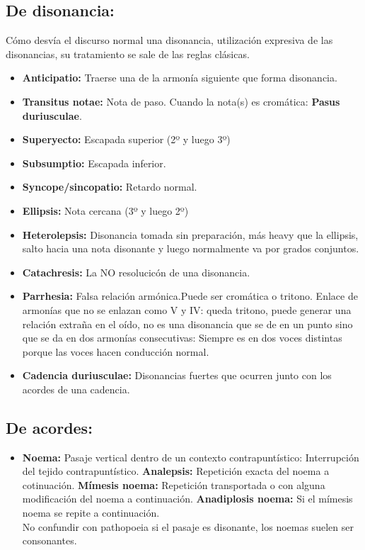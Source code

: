 \documentclass[11pt,a4paper]{article}
\begin{document}
		\subsection{De disonancia:}
			Cómo desvía el discurso normal una disonancia, utilización expresiva de las disonancias, su tratamiento se sale de las reglas clásicas.
			\begin{itemize}
				\item \textbf{Anticipatio:} Traerse una de la armonía siguiente que forma disonancia.
				\item \textbf{Transitus notae:} Nota de paso. Cuando la nota(s) es cromática: \textbf{Pasus duriusculae}.
				\item \textbf{Superyecto:} Escapada superior (2º y luego 3º)
				\item \textbf{Subsumptio:} Escapada inferior.
				\item \textbf{Syncope/sincopatio:} Retardo normal.
				\item \textbf{Ellipsis:} Nota cercana (3º y luego 2º)
				\item \textbf{Heterolepsis:} Disonancia tomada sin preparación, más heavy que la ellipsis, salto hacia una nota disonante y luego normalmente va por grados conjuntos.
				\item \textbf{Catachresis:} La NO resolucicón de una disonancia.
				\item \textbf{Parrhesia:} Falsa relación armónica.Puede ser cromática o tritono. Enlace de armonías que no se enlazan como V y IV: queda tritono, puede generar una relación extraña en el oído, no es una disonancia que se de en un punto sino que se da en dos armonías consecutivas: Siempre es en dos voces distintas porque las voces hacen conducción normal.
				\item \textbf{Cadencia duriusculae:} Disonancias fuertes que ocurren junto con los acordes de una cadencia.
			\end{itemize}
		\subsection{De acordes:}
			\begin{itemize}
				\item \textbf{Noema:} Pasaje vertical dentro de un contexto contrapuntístico: Interrupción del tejido contrapuntístico.
				\subitem \textbf{Analepsis:} Repetición exacta del noema a cotinuación.
				\subitem \textbf{Mímesis noema:} Repetición transportada o con alguna modificación del noema a continuación.
				\subitem \textbf{Anadiplosis noema:} Si el mímesis noema se repite a continuación.\\
				No confundir con pathopoeia si el pasaje es disonante, los noemas suelen ser consonantes.
				
			\end{itemize}
\end{document}
